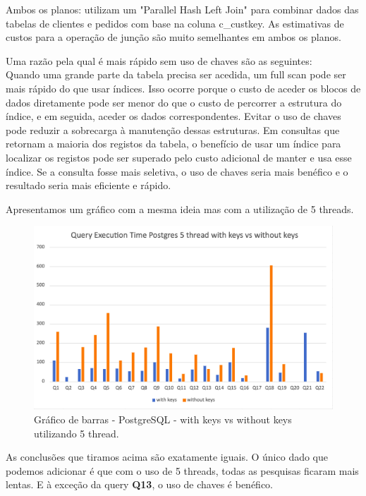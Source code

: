 \documentclass{article}
\begin{document}
Ambos os planos: utilizam um "Parallel Hash Left Join" para combinar dados das tabelas de clientes e pedidos com base na coluna c\_custkey. As estimativas de custos para a operação de junção são muito semelhantes em ambos os planos.

Uma razão pela qual é mais rápido sem uso de chaves são as seguintes:\\
Quando uma grande parte da tabela precisa ser acedida, um full scan pode ser mais rápido do que usar índices. Isso ocorre porque o custo de aceder os blocos de dados diretamente pode ser menor do que o custo de percorrer a estrutura do índice, e em seguida, aceder os dados correspondentes.
Evitar o uso de chaves pode reduzir a sobrecarga à manutenção dessas estruturas. Em consultas que retornam a maioria dos registos da tabela, o benefício de usar um índice para localizar os registos pode ser superado pelo custo adicional de manter e usa esse índice.
Se a consulta fosse mais seletiva, o uso de chaves seria mais benéfico e o resultado seria mais eficiente e rápido.

Apresentamos um gráfico com a mesma ideia mas com a utilização de 5 threads.

\begin{figure}[H]
  \centering
  \includegraphics[width=\textwidth]{Graphs/postgres5threads_withkeysvswithoutkeys.png}
  \caption{Gráfico de barras - PostgreSQL - with keys vs without keys utilizando 5 thread.} 
  \label{fig:PKCreation2}
\end{figure}
As conclusões que tiramos acima são exatamente iguais. O único dado que podemos adicionar é que com o uso de 5 threads, todas as pesquisas ficaram mais lentas. E à exceção da query \textbf{Q13}, o uso de chaves é benéfico.

\clearpage
\end{document}
